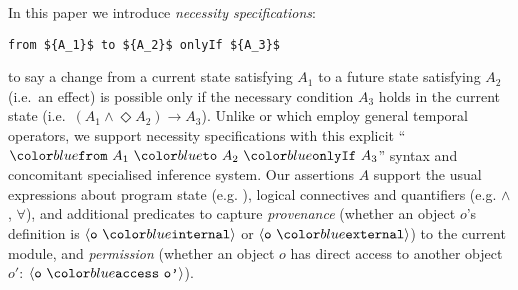 
In this paper we introduce
%
%
\textit{necessity specifications}:
%
%
%
%
\begin{lstlisting}[mathescape=true, language=chainmail, frame=lines]
from ${A_1}$ to ${A_2}$ onlyIf ${A_3}$ 
\end{lstlisting}
%
to say a change from a current state satisfying $A_1$ to a future
state satisfying $A_2$ (i.e.\ an effect) is possible only if the necessary condition
$A_3$ holds in the current state
%
(i.e.\ $(A_1 \wedge \Diamond A_2) \longrightarrow A_3$).
%
Unlike \citeauthor{VerX} or \citeauthor{FASE}
which employ general temporal operators, 
we support necessity specifications with this explicit
%
``$\onlyIf {A_1} {A_2} {A_3}$'' syntax
%
and concomitant specialised inference system.
%
%
Our assertions $A$ support the usual expressions about program state
(e.g. ), logical connectives and quantifiers
(e.g. $\wedge$, $\forall$), and additional predicates
to capture \textit{provenance} (whether an object $o$'s definition is
$\internal{\texttt{o}}$ or $\external{\texttt{o}}$) to the current
module, and \textit{permission} \cite{miller-esop2013} (whether an
object $o$ has direct access to another object $o'$:
$\access{\texttt{o}}{\texttt{o'}}$).
 

  
